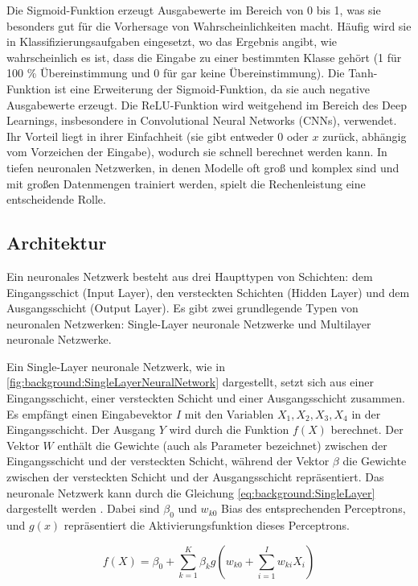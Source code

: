     Die Sigmoid-Funktion erzeugt Ausgabewerte im Bereich von 0 bis 1, was sie besonders gut für die Vorhersage von Wahrscheinlichkeiten macht. Häufig wird sie in Klassifizierungsaufgaben eingesetzt, wo das Ergebnis angibt, wie wahrscheinlich es ist, dass die Eingabe zu einer bestimmten Klasse gehört (1 für 100 \% Übereinstimmung und 0 für gar keine Übereinstimmung). Die Tanh-Funktion ist eine Erweiterung der Sigmoid-Funktion, da sie auch negative Ausgabewerte erzeugt. Die ReLU-Funktion wird weitgehend im Bereich des Deep Learnings, insbesondere in Convolutional Neural Networks (CNNs), verwendet. Ihr Vorteil liegt in ihrer Einfachheit (sie gibt entweder 0 oder $ x $ zurück, abhängig vom Vorzeichen der Eingabe), wodurch sie schnell berechnet werden kann. In tiefen neuronalen Netzwerken, in denen Modelle oft groß und komplex sind und mit großen Datenmengen trainiert werden, spielt die Rechenleistung eine entscheidende Rolle. 

    \subsection{Architektur}
    Ein neuronales Netzwerk besteht aus drei Haupttypen von Schichten: dem Eingangsschict (Input Layer), den versteckten Schichten (Hidden Layer) und dem Ausgangsschicht (Output Layer). Es gibt zwei grundlegende Typen von neuronalen Netzwerken: Single-Layer neuronale Netzwerke und Multilayer neuronale Netzwerke.

    Ein Single-Layer neuronale Netzwerk, wie in \ref{fig:background:SingleLayerNeuralNetwork} dargestellt, setzt sich aus einer Eingangsschicht, einer versteckten Schicht und einer Ausgangsschicht zusammen. Es empfängt einen Eingabevektor $I$ mit den Variablen $X_1, X_2, X_3, X_4$  in der Eingangsschicht. Der Ausgang $Y$ wird durch die Funktion $f(X)$ berechnet. Der Vektor $W$ enthält die Gewichte (auch als Parameter bezeichnet) zwischen der Eingangsschicht und der versteckten Schicht, während der Vektor $\beta$ die Gewichte zwischen der versteckten Schicht und der Ausgangsschicht repräsentiert. Das neuronale Netzwerk kann durch die Gleichung \ref{eq:background:SingleLayer} dargestellt werden \cite{introAI}. Dabei sind $\beta_0$ und $w_{k0}$ Bias des entsprechenden Perceptrons, und $g(x)$ repräsentiert die Aktivierungsfunktion dieses Perceptrons.
    
    \begin{equation}
        f(X) = \beta_0 + \sum_{k=1}^{K} \beta_k g(w_{k0} + \sum_{i=1}^{I} w_{ki} X_i)
    \label{eq:background:SingleLayer}
    \end{equation}

